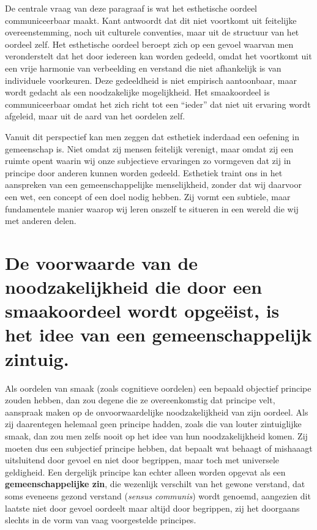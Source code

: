 \begin{mdframed}[leftmargin=0pt,rightmargin=0pt,backgroundcolor=blue!6,linecolor=white,innertopmargin=6pt,innerbottommargin=6pt]
De centrale vraag van deze paragraaf is wat het esthetische oordeel communiceerbaar maakt. Kant antwoordt dat dit niet voortkomt uit feitelijke overeenstemming, noch uit culturele conventies, maar uit de structuur van het oordeel zelf. Het esthetische oordeel beroept zich op een gevoel waarvan men veronderstelt dat het door iedereen kan worden gedeeld, omdat het voortkomt uit een vrije harmonie van verbeelding en verstand die niet afhankelijk is van individuele voorkeuren. Deze gedeeldheid is niet empirisch aantoonbaar, maar wordt gedacht als een noodzakelijke mogelijkheid. Het smaakoordeel is communiceerbaar omdat het zich richt tot een “ieder” dat niet uit ervaring wordt afgeleid, maar uit de aard van het oordelen zelf.

Vanuit dit perspectief kan men zeggen dat esthetiek inderdaad een oefening in gemeenschap is. Niet omdat zij mensen feitelijk verenigt, maar omdat zij een ruimte opent waarin wij onze subjectieve ervaringen zo vormgeven dat zij in principe door anderen kunnen worden gedeeld. Esthetiek traint ons in het aanspreken van een gemeenschappelijke menselijkheid, zonder dat wij daarvoor een wet, een concept of een doel nodig hebben. Zij vormt een subtiele, maar fundamentele manier waarop wij leren onszelf te situeren in een wereld die wij met anderen delen.
\end{mdframed}

\section{De voorwaarde van de noodzakelijkheid die door een smaakoordeel wordt opgeëist, is het idee van een gemeenschappelijk zintuig.} %

Als oordelen van smaak (zoals cognitieve oordelen) een bepaald objectief principe zouden hebben, dan zou degene die ze overeenkomstig dat principe velt, aanspraak maken op de onvoorwaardelijke noodzakelijkheid van zijn oordeel. Als zij daarentegen helemaal geen principe hadden, zoals die van louter zintuiglijke smaak, dan zou men zelfs nooit op het idee van hun noodzakelijkheid komen. Zij moeten dus een subjectief principe hebben, dat bepaalt wat behaagt of mishaaagt uitsluitend door gevoel en niet door begrippen, maar toch met universele geldigheid. Een dergelijk principe kan echter alleen worden opgevat als een \textbf{gemeenschappelijke zin}, die wezenlijk verschilt van het gewone verstand, dat soms eveneens gezond verstand (\emph{sensus communis}) wordt genoemd, aangezien dit laatste niet door gevoel oordeelt maar altijd door begrippen, zij het doorgaans slechts in de vorm van vaag voorgestelde principes.

